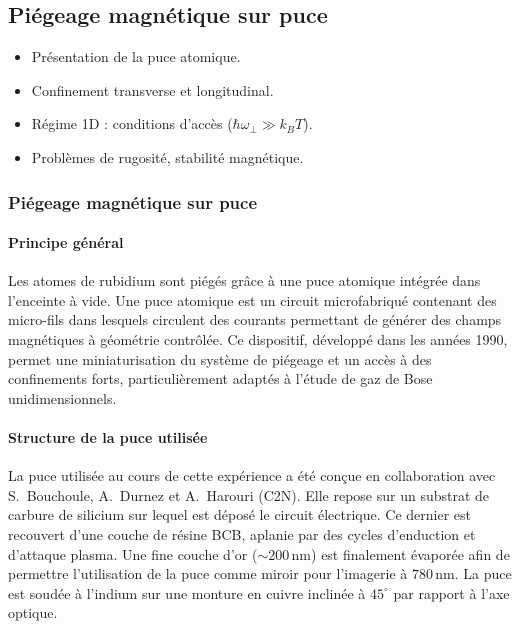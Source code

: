 \subsection{Piégeage magnétique sur puce}
{\color{blue}
\begin{itemize}
    \item Présentation de la puce atomique.
    \item Confinement transverse et longitudinal.
    \item Régime 1D : conditions d’accès (\(\hbar \omega_\perp \gg k_B T\)).
    \item Problèmes de rugosité, stabilité magnétique.
\end{itemize}
}

\subsubsection{Piégeage magnétique sur puce}
\label{sec:piegeage_puce}

\paragraph{Principe général}
Les atomes de rubidium sont piégés grâce à une puce atomique intégrée dans l’enceinte à vide. Une puce atomique est un circuit microfabriqué contenant des micro-fils dans lesquels circulent des courants permettant de générer des champs magnétiques à géométrie contrôlée. Ce dispositif, développé dans les années 1990, permet une miniaturisation du système de piégeage et un accès à des confinements forts, particulièrement adaptés à l'étude de gaz de Bose unidimensionnels.

\paragraph{Structure de la puce utilisée}
La puce utilisée au cours de cette expérience a été conçue en collaboration avec S.~Bouchoule, A.~Durnez et A.~Harouri (C2N). Elle repose sur un substrat de carbure de silicium sur lequel est déposé le circuit électrique. Ce dernier est recouvert d’une couche de résine BCB, aplanie par des cycles d’enduction et d’attaque plasma. Une fine couche d’or (\(\sim200\,\mathrm{nm}\)) est finalement évaporée afin de permettre l’utilisation de la puce comme miroir pour l’imagerie à \(780\,\mathrm{nm}\). La puce est soudée à l’indium sur une monture en cuivre inclinée à \(45^\circ\) par rapport à l’axe optique.

